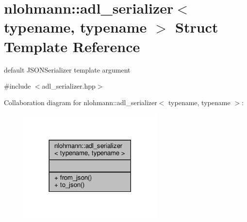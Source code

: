 \hypertarget{structnlohmann_1_1adl__serializer}{}\section{nlohmann\+:\+:adl\+\_\+serializer$<$ typename, typename $>$ Struct Template Reference}
\label{structnlohmann_1_1adl__serializer}


default J\+S\+O\+N\+Serializer template argument  




{\ttfamily \#include $<$adl\+\_\+serializer.\+hpp$>$}



Collaboration diagram for nlohmann\+:\+:adl\+\_\+serializer$<$ typename, typename $>$\+:\nopagebreak
\begin{figure}[H]
\begin{center}
\leavevmode
\includegraphics[width=206pt]{structnlohmann_1_1adl__serializer__coll__graph}
\end{center}
\end{figure}
